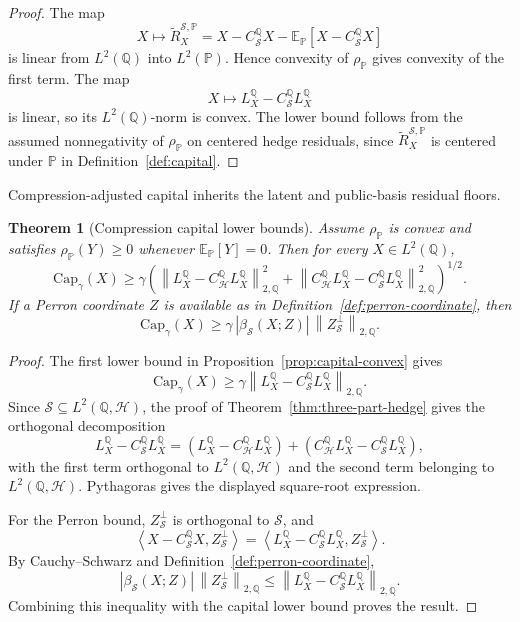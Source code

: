 \documentclass[11pt,a4paper]{amsart}
\theoremstyle{plain}
\newtheorem{theorem}{Theorem}[section]
\theoremstyle{definition}
\theoremstyle{remark}
\newcommand{\PP}{\mathbb{P}}
\newcommand{\QQ}{\mathbb{Q}}
\newcommand{\EE}{\mathbb{E}}
\newcommand{\cH}{\mathcal{H}}
\newcommand{\cS}{\mathcal{S}}
\newcommand{\norm}[1]{\left\lVert #1\right\rVert}
\newcommand{\ip}[2]{\left\langle #1,#2\right\rangle}
\begin{document}
\begin{proof}
The map
\[
        X\mapsto \widetilde R_X^{\cS,\PP}
        =
        X-C_{\cS}^{\QQ}X-\EE_\PP[X-C_{\cS}^{\QQ}X]
\]
is linear from \(L^2(\QQ)\) into \(L^2(\PP)\).  Hence convexity of \(\rho_\PP\) gives convexity of
the first term.  The map
\[
        X\mapsto L_X^\QQ-C_{\cS}^{\QQ}L_X^\QQ
\]
is linear, so its \(L^2(\QQ)\)-norm is convex.  The lower bound follows from the assumed
nonnegativity of \(\rho_\PP\) on centered hedge residuals, since
\(\widetilde R_X^{\cS,\PP}\) is centered under \(\PP\) in Definition~\ref{def:capital}.
\end{proof}

Compression-adjusted capital inherits the latent and public-basis residual floors.

\begin{theorem}[Compression capital lower bounds]\label{thm:capital-lower-bound}
Assume \(\rho_\PP\) is convex and satisfies \(\rho_\PP(Y)\ge0\) whenever \(\EE_\PP[Y]=0\).  Then
for every \(X\in L^2(\QQ)\),
\[
        \mathrm{Cap}_{\gamma}(X)
        \ge
        \gamma
        \left(
        \norm{L_X^\QQ-C_{\cH}^{\QQ}L_X^\QQ}_{2,\QQ}^{2}
        +
        \norm{C_{\cH}^{\QQ}L_X^\QQ-C_{\cS}^{\QQ}L_X^\QQ}_{2,\QQ}^{2}
        \right)^{1/2}.
\]
If a Perron coordinate \(Z\) is available as in Definition~\ref{def:perron-coordinate}, then
\[
        \mathrm{Cap}_{\gamma}(X)
        \ge
        \gamma\,|\beta_{\cS}(X;Z)|\,\norm{Z_{\cS}^{\perp}}_{2,\QQ}.
\]
\end{theorem}

\begin{proof}
The first lower bound in Proposition~\ref{prop:capital-convex} gives
\[
        \mathrm{Cap}_{\gamma}(X)
        \ge
        \gamma\norm{L_X^\QQ-C_{\cS}^{\QQ}L_X^\QQ}_{2,\QQ}.
\]
Since \(\cS\subseteq L^2(\QQ,\cH)\), the proof of Theorem~\ref{thm:three-part-hedge} gives the
orthogonal decomposition
\[
        L_X^\QQ-C_{\cS}^{\QQ}L_X^\QQ
        =
        (L_X^\QQ-C_{\cH}^{\QQ}L_X^\QQ)
        +
        (C_{\cH}^{\QQ}L_X^\QQ-C_{\cS}^{\QQ}L_X^\QQ),
\]
with the first term orthogonal to \(L^2(\QQ,\cH)\) and the second term belonging to
\(L^2(\QQ,\cH)\).  Pythagoras gives the displayed square-root expression.

For the Perron bound, \(Z_{\cS}^{\perp}\) is orthogonal to \(\cS\), and
\[
        \ip{X-C_{\cS}^{\QQ}X}{Z_{\cS}^{\perp}}
        =
        \ip{L_X^\QQ-C_{\cS}^{\QQ}L_X^\QQ}{Z_{\cS}^{\perp}}.
\]
By Cauchy--Schwarz and Definition~\ref{def:perron-coordinate},
\[
        |\beta_{\cS}(X;Z)|\,\norm{Z_{\cS}^{\perp}}_{2,\QQ}
        \le
        \norm{L_X^\QQ-C_{\cS}^{\QQ}L_X^\QQ}_{2,\QQ}.
\]
Combining this inequality with the capital lower bound proves the result.
\end{proof}
\end{document}
